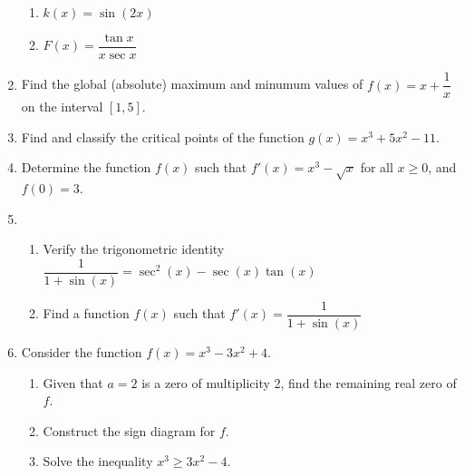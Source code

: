 \documentclass[12pt]{article}
\newcommand{\points}[1]{\marginpar{\hspace{24pt}[#1]}}
\begin{document}
\begin{enumerate}
\begin{enumerate}
 \item $k(x) = \sin (2x)$ \points{2}

\vspace{1.5in}

 \item $F(x) = \dfrac{\tan x}{x\sec x}$ \points{3}
\end{enumerate}
\newpage

\item Find the global (absolute) maximum and minumum values of $f(x) = x+\dfrac{1}{x}$ on the interval $[1,5]$. \points{5}

\vspace{4in}

\item Find and classify the critical points of the function $g(x) = x^3+5x^2-11$. \points{5}

\newpage

\item Determine the function $f(x)$ such that $f'(x) = x^3-\sqrt{x}$ for all $x\geq 0$, and $f(0)=3$. \points{4}

\vspace{3in}

\item \begin{enumerate}
       \item Verify the trigonometric identity $\dfrac{1}{1+\sin (x)} = \sec^2(x)-\sec(x)\tan(x)$ \points{3}

\vspace{3in}

\item Find a function $f(x)$ such that $f'(x) = \dfrac{1}{1+\sin (x)}$ \points{3}
      \end{enumerate}
\newpage

\item Consider the function $f(x) = x^3-3x^2+4$.
\begin{enumerate}
 \item Given that $a=2$ is a zero of multiplicity 2, find the remaining real zero of $f$. \points{4}

\vspace{3in}

 \item Construct the sign diagram for $f$. \points{2}

\vspace{1in}

 \item Solve the inequality $x^3\geq 3x^2-4$. \points{2}


\end{enumerate}
\end{enumerate}
\end{document}
